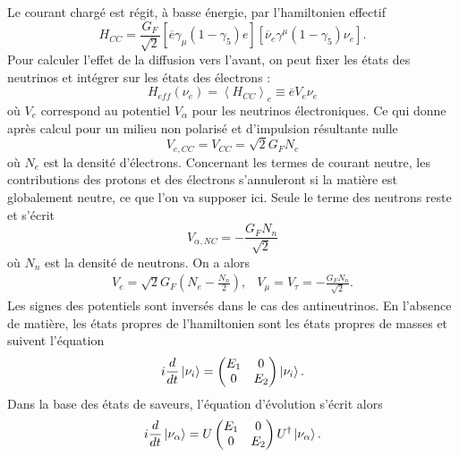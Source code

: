             Le courant chargé est régit, à basse énergie, par l'hamiltonien effectif\cite{Akhmedov2000}
            \begin{equation}
                H_{CC} = \frac{G_F}{\sqrt{2}}\left[\overline{e}\gamma_{\mu}(1-\gamma_5)e\right]\left[\overline{\nu}_e\gamma^{\mu}(1-\gamma_5)\nu_e\right].
            \end{equation}
            Pour calculer l'effet de la diffusion vers l'avant, on peut fixer les états des neutrinos et intégrer sur les états des électrons : 
            \begin{equation}
                H_{eff}(\nu_e) = \left<H_{CC}\right>_{e} \equiv \overline{e}V_e\nu_e
            \end{equation}
            où $V_e$ correspond au potentiel $V_{\alpha}$ pour les neutrinos électroniques. Ce qui donne après calcul pour un milieu non polarisé et d'impulsion résultante nulle\cite{Akhmedov2000}
            \begin{equation}
                V_{e,CC} = V_{CC} = \sqrt{2}G_F N_e
            \end{equation}
            où $N_e$ est la densité d'électrons. Concernant les termes de courant neutre, les contributions des protons et des électrons s'annuleront si la matière est globalement neutre, ce que l'on va supposer ici. Seule le terme des neutrons reste et s'écrit 
            \begin{equation}
                V_{\alpha,NC} = -\frac{G_F N_n}{\sqrt{2}}
            \end{equation}
            où $N_n$ est la densité de neutrons. On a alors 
            \begin{eqnarray}
                V_e = \sqrt{2}G_F\left(N_e-\frac{N_n}{2}\right), & V_{\mu} = V_{\tau} = -\frac{G_F N_n}{\sqrt{2}}.
            \end{eqnarray}
            Les signes des potentiels sont inversés dans le cas des antineutrinos.
            En l'absence de matière, les états propres de l'hamiltonien sont les états propres de masses et suivent l'équation
            \begin{equation}
                i\frac{d}{dt}\ket{\nu_i} = \left(\begin{matrix}E_1 & 0 \\ 0 & E_2\end{matrix}\right)\ket{\nu_i}.
            \end{equation}
            Dans la base des états de saveurs, l'équation d'évolution s'écrit alors
            \begin{equation}\label{eq::evolution_matter_2flavor}
                i\frac{d}{dt}\ket{\nu_{\alpha}} = U\left(\begin{matrix}E_1 & 0 \\ 0 & E_2\end{matrix}\right)U^{\dagger}\ket{\nu_{\alpha}}.
            \end{equation}
